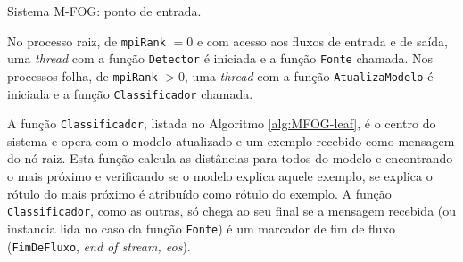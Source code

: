 \begin{algorithm}[htb]
    \KwParams{\mpiRank, \mpiSize}
\caption{Sistema M-FOG: ponto de entrada.}
\label{alg:MFOG}
\end{algorithm}

No processo raiz, de \texttt{mpiRank} $= 0$ e com acesso aos fluxos de entrada e
de saída, uma \emph{thread} com a função \texttt{Detector} é iniciada e a função
\texttt{Fonte} chamada.
Nos processos folha, de \texttt{mpiRank} $> 0$, uma \emph{thread} com a função
\texttt{AtualizaModelo} é iniciada e a função \texttt{Classificador} chamada.

A função \texttt{Classificador}, listada no Algoritmo \ref{alg:MFOG-leaf}, é o
centro do sistema e opera com o modelo atualizado e um exemplo recebido como
mensagem do nó raiz.
Esta função calcula as distâncias para todos \mclusters do modelo e encontrando
o mais próximo e verificando se o modelo explica aquele exemplo, se explica o
rótulo do \mcluster mais próximo é atribuído como rótulo do exemplo.
A função \texttt{Classificador}, como as outras, só chega ao seu final se a
mensagem recebida (ou instancia lida no caso da função \texttt{Fonte}) é um
marcador de fim de fluxo (\texttt{FimDeFluxo}, \emph{end of stream, eos}).


